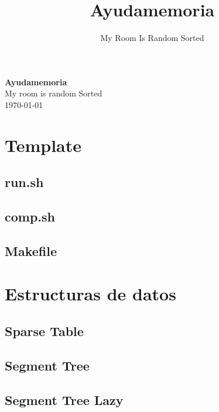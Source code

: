 \documentclass[a4paper,11pt,landscape,twocolumn]{article}
\title{Ayudamemoria}
\author{My Room Is Random Sorted}
\begin{document}
\begin{center}
    \LARGE\textbf{Ayudamemoria}\\[1em]
    \large My room is random Sorted\\[1em]
    \normalsize \today\\[1em]
\end{center}

\tableofcontents

\section{Template}



\subsection{run.sh}



\subsection{comp.sh}



\subsection{Makefile}



\section{Estructuras de datos}

\subsection{Sparse Table}



\subsection{Segment Tree}



\subsection{Segment Tree Lazy}
\end{document}
